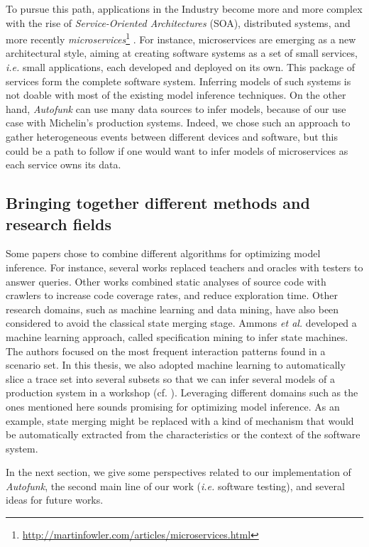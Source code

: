 To pursue this path, applications in the Industry become more and
more complex with the rise of \emph{Service-Oriented
Architectures} (SOA), distributed systems, and more recently
\emph{microservices}\footnote{\url{http://martinfowler.com/articles/microservices.html}}
\cite{thones2015microservices}.  For instance, microservices are
emerging as a new architectural style, aiming at creating
software systems as a set of small services, \emph{i.e.} small
applications, each developed and deployed on its own. This
package of services form the complete software system. Inferring
models of such systems is not doable with most of the existing
model inference techniques. On the other hand, \textit{Autofunk}
can use many data sources to infer models, because of our use
case with Michelin's production systems. Indeed, we chose such an
approach to gather heterogeneous events between different devices
and software, but this could be a path to follow if one would
want to infer models of microservices as each service owns its
data.

\subsection{Bringing together different methods and research
fields}

Some papers chose to combine different algorithms for optimizing
model inference. For instance, several works
\cite{Alur:2005:SIS:1047659.1040314,Raffelt:2005:LLA:1081180.1081189,ngll11}
replaced teachers and oracles with testers to answer queries.
Other works \cite{Azim13,WPX13} combined static analyses of
source code with crawlers to increase code coverage rates, and
reduce exploration time. Other  research domains, such as machine
learning and data mining, have also been considered to avoid the
classical state merging stage. Ammons \emph{et al.}
\cite{Ammons:2002:MS:565816.503275} developed a machine learning
approach, called specification mining to infer state machines.
The authors focused on the most frequent interaction patterns
found in a scenario set. In this thesis, we also adopted machine
learning to automatically slice a trace set into several subsets
so that we can infer several models of a production system in a
workshop (cf.
).
Leveraging different domains such as the ones mentioned here
sounds promising for optimizing model inference. As an example,
state merging might be replaced with a kind of mechanism that
would be automatically extracted from the characteristics or the
context of the software system.

In the next section, we give some perspectives related to our
implementation of \emph{Autofunk}, the second main line of our
work (\emph{i.e.} software testing), and several ideas for future
works.

